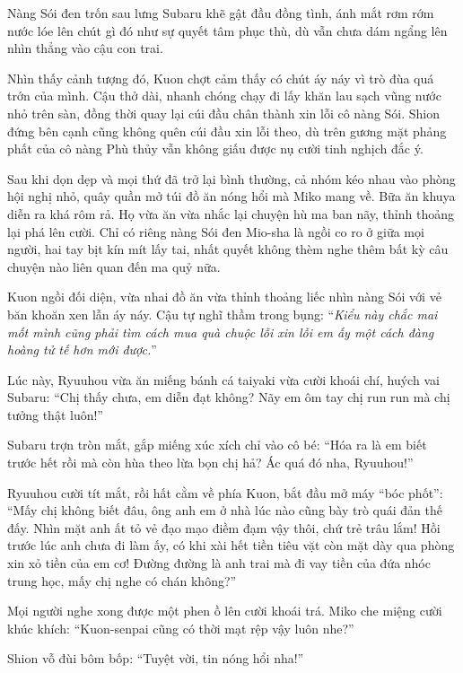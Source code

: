 \documentclass[../main.tex]{subfiles}
\begin{document}
Nàng Sói đen trốn sau lưng Subaru khẽ gật đầu đồng tình, ánh mắt rơm rớm nước lóe lên chút gì đó như sự quyết tâm phục thù, dù vẫn chưa dám ngẩng lên nhìn thẳng vào cậu con trai.

Nhìn thấy cảnh tượng đó, Kuon chợt cảm thấy có chút áy náy vì trò đùa quá trớn của mình. Cậu thở dài, nhanh chóng chạy đi lấy khăn lau sạch vũng nước nhỏ trên sàn, đồng thời quay lại cúi đầu chân thành xin lỗi cô nàng Sói. Shion đứng bên cạnh cũng không quên cúi đầu xin lỗi theo, dù trên gương mặt phảng phất của cô nàng Phù thủy vẫn không giấu được nụ cười tinh nghịch đắc ý.

\ct

Sau khi dọn dẹp và mọi thứ đã trở lại bình thường, cả nhóm kéo nhau vào phòng hội nghị nhỏ, quây quần mở túi đồ ăn nóng hổi mà Miko mang về. Bữa ăn khuya diễn ra khá rôm rả. Họ vừa ăn vừa nhắc lại chuyện hù ma ban nãy, thỉnh thoảng lại phá lên cười. Chỉ có riêng nàng Sói đen Mio-sha là ngồi co ro ở giữa mọi người, hai tay bịt kín mít lấy tai, nhất quyết không thèm nghe thêm bất kỳ câu chuyện nào liên quan đến ma quỷ nữa.

Kuon ngồi đối diện, vừa nhai đồ ăn vừa thỉnh thoảng liếc nhìn nàng Sói với vẻ băn khoăn xen lẫn áy náy. Cậu tự nghĩ thầm trong bụng: ``\textit{Kiểu này chắc mai mốt mình cũng phải tìm cách mua quà chuộc lỗi xin lỗi em ấy một cách đàng hoàng tử tế hơn mới được.}''

Lúc này, Ryuuhou vừa ăn miếng bánh cá taiyaki vừa cười khoái chí, huých vai Subaru: ``Chị thấy chưa, em diễn đạt không? Nãy em ôm tay chị run run mà chị tưởng thật luôn!''

Subaru trợn tròn mắt, gắp miếng xúc xích chỉ vào cô bé: ``Hóa ra là em biết trước hết rồi mà còn hùa theo lừa bọn chị hả? Ác quá đó nha, Ryuuhou!''

Ryuuhou cười tít mắt, rồi hất cằm về phía Kuon, bắt đầu mở máy ``bóc phốt'': ``Mấy chị không biết đâu, ông anh em ở nhà lúc nào cũng bày trò quái đản thế đấy. Nhìn mặt anh ất tỏ vẻ đạo mạo điềm đạm vậy thôi, chứ trẻ trâu lắm! Hồi trước lúc anh chưa đi làm ấy, có khi xài hết tiền tiêu vặt còn mặt dày qua phòng xin xỏ tiền của em cơ! Đường đường là anh trai mà đi vay tiền của đứa nhóc trung học, mấy chị nghe có chán không?''

Mọi người nghe xong được một phen ồ lên cười khoái trá. Miko che miệng cười khúc khích: ``Kuon-senpai cũng có thời mạt rệp vậy luôn nhe?''

Shion vỗ đùi bôm bốp: ``Tuyệt vời, tin nóng hổi nha!''
\end{document}
